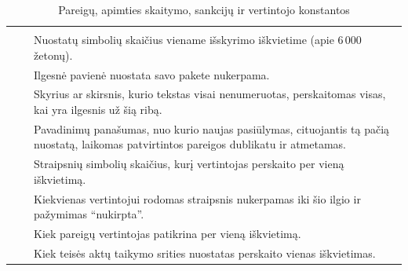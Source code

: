 \begin{xltabular}{\textwidth}{@{}L{44mm}L{19mm}Y@{}}
\caption{Pareigų, apimties skaitymo, sankcijų ir vertintojo
konstantos}\label{tab:config:obligations}\\
\toprule
{} &  &  \\
\midrule
\endfirsthead
\toprule
{} &  &  \\
\midrule
\endhead
\bottomrule
\endlastfoot
{} &  & Nuostatų simbolių skaičius viename išskyrimo iškvietime (apie 6\,000 žetonų). \\
 &  & Ilgesnė pavienė nuostata savo pakete nukerpama. \\
 &  & Skyrius ar skirsnis, kurio tekstas visai nenumeruotas, perskaitomas visas, kai yra ilgesnis už šią ribą. \\
 &  & Pavadinimų panašumas, nuo kurio naujas pasiūlymas, cituojantis tą pačią nuostatą, laikomas patvirtintos pareigos dublikatu ir atmetamas. \\
 &  & Straipsnių simbolių skaičius, kurį vertintojas perskaito per vieną iškvietimą. \\
 &  & Kiekvienas vertintojui rodomas straipsnis nukerpamas iki šio ilgio ir pažymimas \enquote{nukirpta}. \\
 &  & Kiek pareigų vertintojas patikrina per vieną iškvietimą. \\
 &  & Kiek teisės aktų taikymo srities nuostatas perskaito vienas iškvietimas. \\

\end{xltabular}
